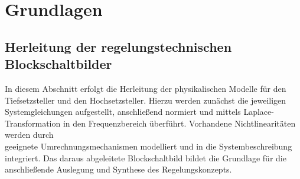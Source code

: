 \chapter{Grundlagen} \label{Grundlagen}
\section{Herleitung der regelungstechnischen Blockschaltbilder} \label{Section_Herleitung_Regelstrecke}
In diesem Abschnitt erfolgt die Herleitung der physikalischen Modelle für den \\ Tiefsetzsteller und den Hochsetzsteller.
Hierzu werden zunächst die jeweiligen\\  Systemgleichungen aufgestellt, anschließend normiert und mittels Laplace-Transformation in den Frequenzbereich überführt.
Vorhandene Nichtlinearitäten werden durch\\ geeignete Umrechnungsmechanismen modelliert und in die Systembeschreibung\\ integriert.
Das daraus abgeleitete Blockschaltbild bildet die Grundlage für die\\  anschließende Auslegung und Synthese des Regelungskonzepts.
